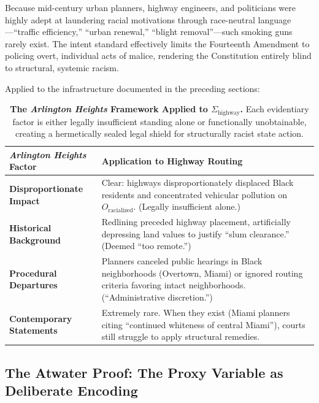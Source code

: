 Because mid-century urban planners, highway engineers, and politicians were highly adept at laundering racial motivations through race-neutral language---``traffic efficiency,'' ``urban renewal,'' ``blight removal''---such smoking guns rarely exist. The intent standard effectively limits the Fourteenth Amendment to policing overt, individual acts of malice, rendering the Constitution entirely blind to structural, systemic racism.

Applied to the infrastructure documented in the preceding sections:

\begin{table}[htbp]
\centering
\small
\renewcommand{\arraystretch}{1.4}
\begin{tabular}{>{\raggedright}p{5.5cm} >{\raggedright\arraybackslash}p{7.5cm}}
\toprule
\textbf{\textit{Arlington Heights} Factor} & \textbf{Application to Highway Routing} \\
\midrule
\textbf{Disproportionate Impact} & Clear: highways disproportionately displaced Black residents and concentrated vehicular pollution on $O_{\text{racialized}}$. (Legally insufficient alone.) \\
\textbf{Historical Background} & Redlining preceded highway placement, artificially depressing land values to justify ``slum clearance.'' (Deemed ``too remote.'') \\
\textbf{Procedural Departures} & Planners canceled public hearings in Black neighborhoods (Overtown, Miami) or ignored routing criteria favoring intact neighborhoods. (``Administrative discretion.'') \\
\textbf{Contemporary Statements} & Extremely rare. When they exist (Miami planners citing ``continued whiteness of central Miami''), courts still struggle to apply structural remedies. \\
\bottomrule
\end{tabular}
\caption{\textbf{The \textit{Arlington Heights} Framework Applied to $\Sigma_{\text{highway}}$.} Each evidentiary factor is either legally insufficient standing alone or functionally unobtainable, creating a hermetically sealed legal shield for structurally racist state action.}
\label{tab:arlington_heights}
\end{table}

\subsection{The Atwater Proof: The Proxy Variable as Deliberate Encoding}

